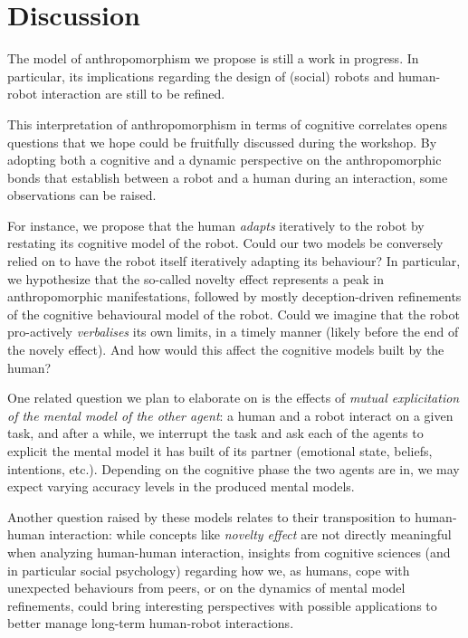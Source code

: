 \documentclass{frontiersSCNS} %
\begin{document}
\section{Discussion}
\label{sec:discussion}

The model of anthropomorphism we propose is still a work in progress. In
particular, its implications regarding the design of (social) robots and
human-robot interaction are still to be refined.

This interpretation of anthropomorphism in terms of cognitive correlates opens
questions that we hope could be fruitfully discussed during the workshop.  By
adopting both a cognitive and a dynamic perspective on the anthropomorphic bonds
that establish between a robot and a human during an interaction, some
observations can be raised.

For instance, we propose that the human \emph{adapts} iteratively to the robot
by restating its cognitive model of the robot. Could our two models be
conversely relied on to have the robot itself iteratively adapting its
behaviour? In particular, we hypothesize that the so-called novelty effect
represents a peak in anthropomorphic manifestations, followed by mostly
deception-driven refinements of the cognitive behavioural model of the robot.
Could we imagine that the robot pro-actively \emph{verbalises} its own limits,
in a timely manner (likely before the end of the novely effect). And how would
this affect the cognitive models built by the human?

One related question we plan to elaborate on is the effects of \emph{mutual
explicitation of the mental model of the other agent}: a human and a robot
interact on a given task, and after a while, we interrupt the task and ask each
of the agents to explicit the mental model it has built of its partner
(emotional state, beliefs, intentions, etc.). Depending on the cognitive phase
the two agents are in, we may expect varying accuracy levels in the produced
mental models.

Another question raised by these models relates to their transposition to
human-human interaction: while concepts like \emph{novelty effect} are not
directly meaningful when analyzing human-human interaction, insights from
cognitive sciences (and in particular social psychology) regarding how we, as
humans, cope with unexpected behaviours from peers, or on the dynamics of mental
model refinements, could bring interesting perspectives with possible
applications to better manage long-term human-robot interactions.
\end{document}
